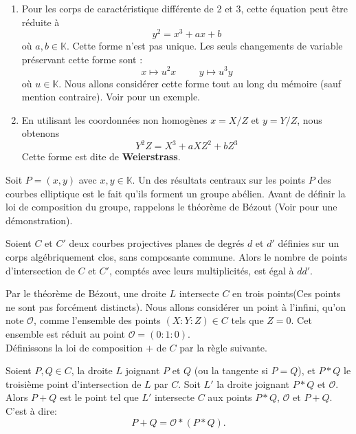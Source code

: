 \documentclass[a4paper]{article}
\begin{document}
\begin{rem}
\begin{enumerate}
 \item  Pour les corps de caractéristique différente de 2 et 3, cette équation peut être réduite à 
 \begin{equation*}
 y^2=x^3+ax+b 
 \end{equation*}
 où $a,b \in \mathbb{K}$.
Cette forme n'est pas unique. Les seuls changements de variable préservant cette forme sont : 
\begin{equation*}
x \mapsto u^2x \hspace{1cm} y \mapsto u^3y
\end{equation*}
où $u \in \mathbb{K}$. Nous allons considérer cette forme tout au long du mémoire (sauf mention contraire).
 Voir \cite{ref} pour un exemple.
 \item  En utilisant les coordonnées non homogènes $x=X/Z$ et $y=Y/Z$, nous obtenons 
\begin{equation*}
Y^2 Z=X^3+aXZ^2+b Z^3
\end{equation*}
Cette forme est dite de \textbf{Weierstrass}.
\end{enumerate}
\end{rem}
\noindent Soit $P=(x,y)$ avec $x,y \in \mathbb{K}$. Un des résultats centraux sur les points $P$ des courbes elliptique est le fait qu'ils forment un groupe abélien. Avant de définir la loi de composition du groupe, rappelons le théorème de Bézout (Voir \cite{ref20} pour une démonstration).
\begin{theorem}[Bézout]
Soient $C$ et $C'$ deux courbes projectives planes de degrés $d$ et $d'$ définies sur un corps algébriquement clos, sans composante commune. Alors le nombre de points d'intersection de $C$ et $C'$, comptés avec leurs multiplicités, est égal à $dd'$.
\end{theorem}
\noindent Par le théorème de Bézout, une droite $L$ intersecte $C$ en trois points(Ces points ne sont pas forcément distincts).
Nous allons considérer un point à l'infini, qu'on note $\mathcal{O}$, comme l'ensemble des points $(X:Y:Z) \in C$ tels que
$Z=0$. Cet ensemble est réduit au point $\mathcal{O}=(0:1:0)$.
\\
Définissons la loi de composition $+$ de $C$ par la règle suivante.

\begin{loi}
Soient $P,Q \in C$, la droite $L$ joignant $P$ et $Q$ (ou la tangente si $P=Q$), et $P*Q$ le troisième point d'intersection  de $L$ par $C$.
Soit $L'$ la droite joignant $P*Q$ et $\mathcal{O}$. Alors $P+Q$ est le point tel que $L'$ intersecte $C$ aux points $P*Q$, $\mathcal{O}$ et $P+Q$. C'est à dire:
\begin{equation*}
P+Q=\mathcal{O}*(P*Q).
\end{equation*}
\end{loi}
\end{document}
